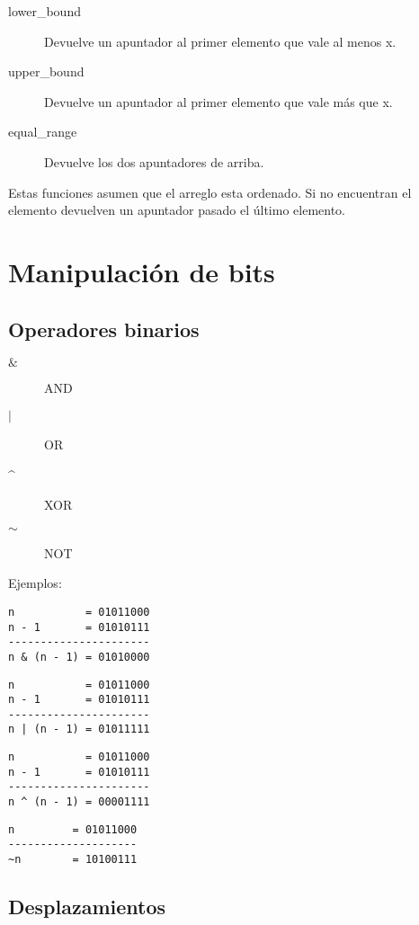 \documentclass[10pt]{article}
\begin{document}
\begin{description}
    \item[lower\_bound] Devuelve un apuntador al primer elemento que vale al menos x.
    \item[upper\_bound] Devuelve un apuntador al primer elemento que vale más que x.
    \item[equal\_range] Devuelve los dos apuntadores de arriba.
\end{description}

Estas funciones asumen que el arreglo esta ordenado. Si no encuentran el
elemento devuelven un apuntador pasado el último elemento.

\section{Manipulación de bits}

\subsection{Operadores binarios}

\begin{description}
    \item[$ \& $] AND
    \item[$ | $] OR
    \item[\^{}] XOR
    \item[$ \sim $] NOT
\end{description}

Ejemplos:

\begin{verbatim}
n           = 01011000
n - 1       = 01010111
----------------------
n & (n - 1) = 01010000
\end{verbatim}

\begin{verbatim}
n           = 01011000
n - 1       = 01010111
----------------------
n | (n - 1) = 01011111
\end{verbatim}

\begin{verbatim}
n           = 01011000
n - 1       = 01010111
----------------------
n ^ (n - 1) = 00001111
\end{verbatim}

\begin{verbatim}
n         = 01011000
--------------------
~n        = 10100111
\end{verbatim}

\subsection{Desplazamientos}
\end{document}
